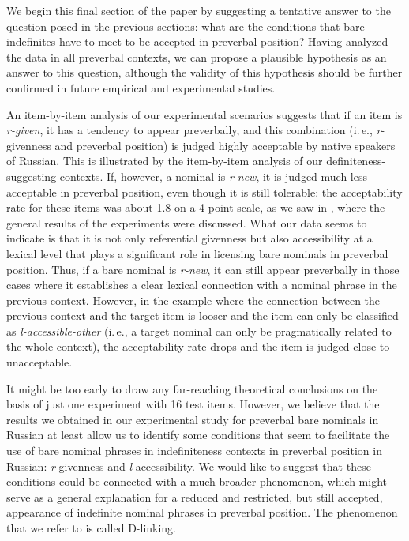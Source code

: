 \documentclass[output=paper]{langsci/langscibook}
\begin{document}
We begin this final section of the paper by suggesting a tentative answer to the question posed in the previous sections: what are the conditions that bare indefinites have to meet to be accepted in preverbal position? Having analyzed the data in all preverbal contexts, we can propose a plausible hypothesis as an answer to this question, although the validity of this hypothesis should be further confirmed in future empirical and experimental studies.

{
An item-by-item analysis of our experimental scenarios suggests that if an item is {\emph{r-given}}, it has a tendency to appear preverbally, and this combination (i.\,e., {\emph{r}}-givenness and preverbal position) is judged highly acceptable by native speakers of Russian. This is illustrated by the item-by-item analysis of our definiteness-suggesting contexts. If, however, a nominal is {\emph{r-new}}, it is judged much less acceptable in preverbal position, even though it is still tolerable: the acceptability rate for these items was about 1.8 on a 4-point scale, as we saw in , where the general results of the experiments were discussed. What our data seems to indicate is that it is not only referential givenness but also accessibility at a lexical level that plays a significant role in licensing bare nominals in preverbal position. Thus, if a bare nominal is {\emph{r-new}}, it can still appear preverbally in those cases where it establishes a clear lexical connection with a nominal phrase in the previous context. However, in the example where the connection between the previous context and the target item is looser and the item can only be classified as {\emph{l-accessible-other}} (i.\,e., a target nominal can only be pragmatically related to the whole context), the acceptability rate drops and the item is judged close to unacceptable.
}

It might be too early to draw any far-reaching theoretical conclusions on the basis of just one experiment with 16 test items. However, we believe that the results we obtained in our experimental study for preverbal bare nominals in Russian at least allow us to identify some conditions that seem to facilitate the use of bare nominal phrases in indefiniteness contexts in preverbal position in Russian: {\emph{r}}-givenness and {\emph{l}}-accessibility. We would like to suggest that these conditions could be connected with a much broader phenomenon, which might serve as a general explanation for a reduced and restricted, but still accepted, appearance of indefinite nominal phrases in preverbal position. The phenomenon that we refer to is called D-linking.
\end{document}
